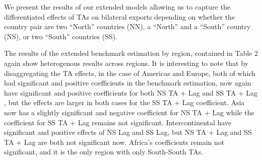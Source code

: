We present the results of our extended models allowing us to capture the
differentiated effects of TAs on bilateral exports depending on whether
the country pair are two ``North'' countries (NN), a ``North'' and a
``South'' country (NS), or two ``South'' countries (SS).

The results of the extended benchmark estimation by region, contained in
Table 2 again show heterogenous results across regions. It is
interesting to note that by disaggregating the TA effects, in the case
of Americas and Europe, both of which had significant and positive
coefficients in the benchmark estimation, now again have significant and
positive coefficients for both NS TA + Lag and SS TA + Lag , but the
effects are larger in both cases for the SS TA + Lag coefficient. Asia
now has a slightly significant and negative coefficient for NS TA + Lag
while the coefficient for SS TA + Lag remains not significant.
Intercontinental have significant and positive effects of NS Lag and SS
Lag, but NS TA + Lag and SS TA + Lag are both not significant now.
Africa's coefficients remain not significant, and it is the only region
with only South-South TAs.
